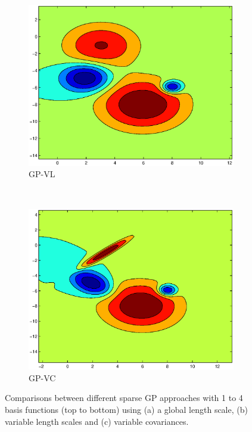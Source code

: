 \documentclass[useAMS,usenatbib,fleqn]{mn2e}
\begin{document}
\begin{figure}
\begin{subfigure}[b]{0.3\columnwidth}
                \includegraphics[width=\textwidth]{figures/GPVL4.eps}
                \caption{GP-VL}
        \end{subfigure}
        ~
        \begin{subfigure}[b]{0.3\columnwidth}
                \includegraphics[width=\textwidth]{figures/GPVC4.eps}
                \caption{GP-VC}
        \end{subfigure}          
        \caption{Comparisons between different sparse GP approaches with 1 to 4 basis functions (top to bottom) using (a) a global length scale, (b) variable length scales and (c) variable covariances.}
        \label{fig-toy-comparison}
\end{figure}
\end{document}
